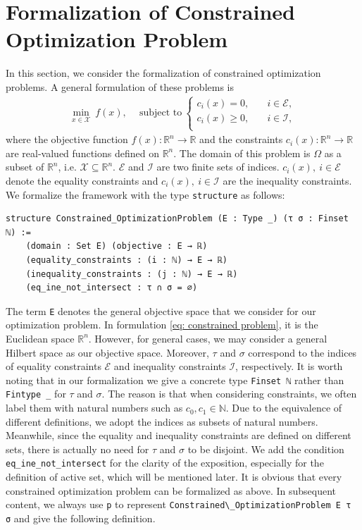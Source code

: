 \documentclass[sn-mathphys]{JORSC-jnl}%
\theoremstyle{thmstyleone}%
\theoremstyle{thmstylethree}%
\newcommand{\lean}[1]{\lstinline[language=lean, mathescape=true]{#1}}
\begin{document}
\section{Formalization of Constrained Optimization Problem}\label{sec: problem}
In this section, we consider the formalization of constrained optimization problems. A general formulation of these problems is
\begin{align}
    \min_{x\in\mathcal{X}}\ f(x), \quad\ \text{subject to}\ \begin{cases}
        c_i(x) = 0,&\quad i \in\mathcal{E},\\
        c_i(x) \geqslant 0,&\quad i \in\mathcal{I},\\
    \end{cases}
    \label{eq: constrained problem}
\end{align}
where the objective function $f(x) : \mathbb{R}^n \to \mathbb{R}$ and the constraints $c_i(x)  : \mathbb{R}^n \to \mathbb{R} $ are real-valued functions defined on $\mathbb{R}^n$. The domain of this problem is $\Omega$ as a subset of $\mathbb{R}^n$, i.e. $\mathcal{X} \subseteq \mathbb{R}^n$. $\mathcal{E}$ and $\mathcal{I}$ are two finite sets of indices. $c_i(x),\ i\in\mathcal{E}$ denote the equality constraints and $c_i(x),\ i\in\mathcal{I}$ are the inequality constraints. We formalize the framework with the type \lean{structure} as follows:
\begin{lstlisting}
structure Constrained_OptimizationProblem (E : Type _) (τ σ : Finset ℕ) :=
    (domain : Set E) (objective : E → ℝ)
    (equality_constraints : (i : ℕ) → E → ℝ)
    (inequality_constraints : (j : ℕ) → E → ℝ)
    (eq_ine_not_intersect : τ ∩ σ = ∅)
\end{lstlisting}
The term \lean{E} denotes the general objective space that we consider for our optimization problem. In formulation \eqref{eq: constrained problem}, it is the Euclidean space $\mathbb{R}^n$. However, for general cases, we may consider a general Hilbert space as our objective space. Moreover, $\tau$ and $\sigma$ correspond to the indices of equality constraints $\mathcal{E}$ and inequality constraints $\mathcal{I}$, respectively. It is worth noting that in our formalization we give a concrete type \lean{Finset ℕ} rather than \lean{Fintype _} for $\tau$ and $\sigma$. The reason is that when considering constraints, we often label them with natural numbers such as $c_0, c_1 \in \mathbb{N}$. Due to the equivalence of different definitions, we adopt the indices as subsets of natural numbers. Meanwhile, since the equality and inequality constraints are defined on different sets, there is actually no need for $\tau$ and $\sigma$ to be disjoint. We add the condition \lean{eq_ine_not_intersect} for the clarity of the exposition, especially for the definition of active set, which will be mentioned later. It is obvious that every constrained optimization problem can be formalized as above. In subsequent content, we always use \lean{p} to represent \lean{Constrained\_OptimizationProblem E τ σ} and give the following definition.
\end{document}
